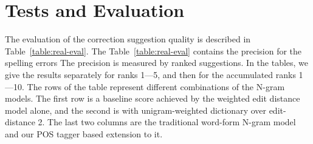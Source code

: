 \documentclass{llncs}
\begin{document}
\section{Tests and Evaluation}
\label{sec:evaluation}

The evaluation of the correction suggestion quality is described in
Table~\ref{table:real-eval}. The Table~\ref{table:real-eval} contains the
precision for the spelling errors The precision is measured by ranked
suggestions. In the tables, we give the results separately for ranks 1---5, and
then for the accumulated ranks 1---10.  The  rows of the table represent
different combinations of the N-gram models. The first row is a baseline score
achieved by the weighted edit distance model alone, and the second is with
unigram-weighted dictionary over edit-distance 2. The last two columns are the
traditional word-form N-gram model and our POS tagger based extension to it.
\end{document}
